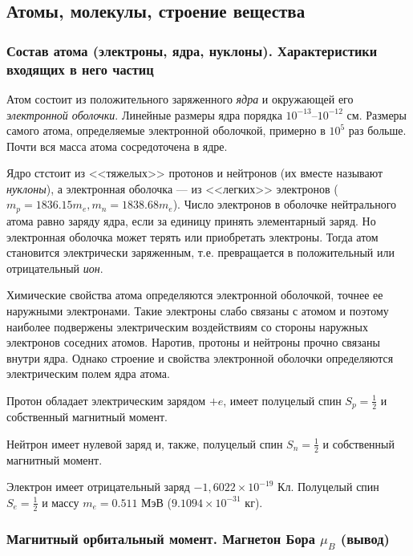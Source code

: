 \subsection{Атомы, молекулы, строение вещества}

\subsubsection{Состав атома (электроны, ядра, нуклоны). Характеристики входящих в него частиц}

Атом состоит из положительного заряженного \textit{ядра} и окружающей его \textit{электронной оболочки}. Линейные размеры ядра порядка $10^{-13}$--$10^{-12}$ см. Размеры самого атома, определяемые электронной оболочкой, примерно в $10^{5}$ раз больше. Почти вся масса атома сосредоточена в ядре. 

Ядро стстоит из <<тяжелых>> протонов и нейтронов (их вместе называют \textit{нуклоны}), а электронная оболочка --- из <<легких>> электронов ($m_p = 1836.15 m_e, m_n = 1838.68 m_e$). Число электронов в оболочке нейтрального атома равно заряду ядра, если за единицу принять элементарный заряд. Но электронная оболочка может терять или приобретать электроны. Тогда атом становится электрически заряженным, т.е. превращается в положительный или отрицательный \textit{ион}.

Химические свойства атома определяются электронной оболочкой, точнее ее наружными электронами. Такие электроны слабо связаны с атомом и поэтому наиболее подвержены электрическим воздействиям со стороны наружных электронов соседних атомов. Наротив, протоны и нейтроны прочно связаны внутри ядра. Однако строение и свойства электронной оболочки определяются электрическим полем ядра атома. 

Протон обладает электрическим зарядом $+e$, имеет полуцелый спин $S_p = \frac{1}{2}$ и собственный магнитный момент.

Нейтрон имеет нулевой заряд и, также, полуцелый спин $S_n = \frac{1}{2}$ и собственный магнитный момент. 

Электрон имеет отрицательный заряд $-1,6022 \times 10^{-19}$ Кл. Полуцелый спин $S_e = \frac{1}{2}$ и массу $m_e = 0.511$ МэВ ($9.1094 \times 10^{-31}$ кг).

\subsubsection{Магнитный орбитальный момент. Магнетон Бора $\mu_B$ (вывод)}

